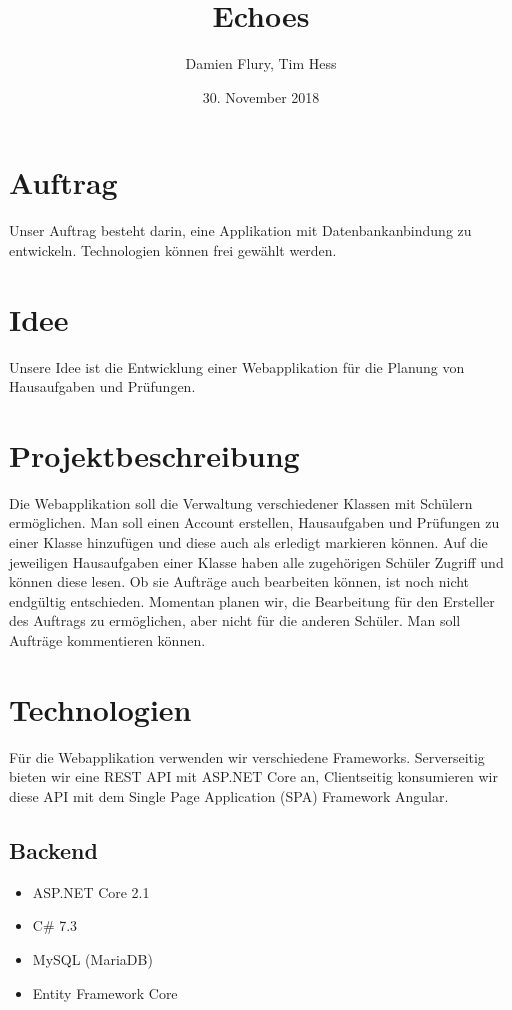 \documentclass[a4paper, titlepage]{article}
\title{Echoes}
\author{Damien Flury, Tim Hess}
\date{30. November 2018}
\begin{document}
    \maketitle
    \tableofcontents
    \newpage
    
    \section{Auftrag}
    Unser Auftrag besteht darin, eine Applikation mit Datenbankanbindung zu entwickeln. Technologien
    können frei gewählt werden.
    \section{Idee}
    Unsere Idee ist die Entwicklung einer Webapplikation für die Planung von Hausaufgaben
    und Prüfungen. 
    \section{Projektbeschreibung}
    Die Webapplikation soll die Verwaltung verschiedener Klassen mit Schülern ermöglichen.
    Man soll einen Account erstellen, Hausaufgaben und Prüfungen zu einer Klasse hinzufügen
    und diese auch als erledigt markieren können. Auf die jeweiligen Hausaufgaben einer Klasse
    haben alle zugehörigen Schüler Zugriff und können diese lesen. Ob sie Aufträge auch bearbeiten
    können, ist noch nicht endgültig entschieden. Momentan planen wir, die Bearbeitung für den Ersteller
    des Auftrags zu ermöglichen, aber nicht für die anderen Schüler. Man soll Aufträge kommentieren
    können.
    \section{Technologien}
    Für die Webapplikation verwenden wir verschiedene Frameworks. Serverseitig bieten wir
    eine REST API mit ASP.NET Core an, Clientseitig konsumieren wir diese API mit dem Single
    Page Application (SPA) Framework Angular.
    \subsection{Backend}
    \begin{itemize}
        \item ASP.NET Core 2.1
        \item C\# 7.3
        \item MySQL (MariaDB)
        \item Entity Framework Core
    \end{itemize}
\end{document}
